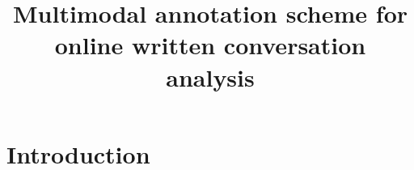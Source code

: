 \documentclass[11pt]{article}
\begin{document}
\title{Multimodal annotation scheme for online written conversation analysis}

\begin{titlepage}

\maketitle

\tableofcontents

\end{titlepage}

\section{Introduction}







% 

% 




% 

% 

% 

\end{document}
